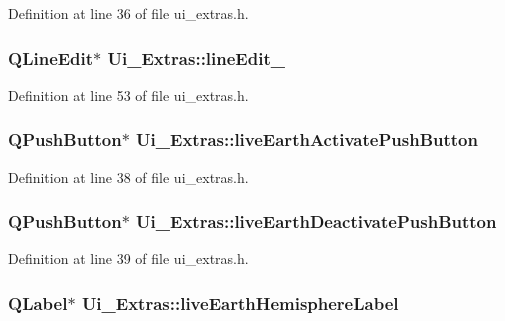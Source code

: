 Definition at line 36 of file ui\_\-extras.h.

\hypertarget{classUi__Extras_a6938f33168c2bb62d7b3ad3092391a3c}{
\subsubsection[{lineEdit\_\-2}]{\setlength{\rightskip}{0pt plus 5cm}QLineEdit$\ast$ {\bf Ui\_\-Extras::lineEdit\_}}}
\label{classUi__Extras_a6938f33168c2bb62d7b3ad3092391a3c}


Definition at line 53 of file ui\_\-extras.h.

\hypertarget{classUi__Extras_ac6fd999821ea077a5a9fb543acc16fd4}{
\subsubsection[{liveEarthActivatePushButton}]{\setlength{\rightskip}{0pt plus 5cm}QPushButton$\ast$ {\bf Ui\_\-Extras::liveEarthActivatePushButton}}}
\label{classUi__Extras_ac6fd999821ea077a5a9fb543acc16fd4}


Definition at line 38 of file ui\_\-extras.h.

\hypertarget{classUi__Extras_a0591653135ec37cba2db9a7cebc06393}{
\subsubsection[{liveEarthDeactivatePushButton}]{\setlength{\rightskip}{0pt plus 5cm}QPushButton$\ast$ {\bf Ui\_\-Extras::liveEarthDeactivatePushButton}}}
\label{classUi__Extras_a0591653135ec37cba2db9a7cebc06393}


Definition at line 39 of file ui\_\-extras.h.

\hypertarget{classUi__Extras_a32d0c47f2bdb36fa0dce8dc81bc51223}{
\subsubsection[{liveEarthHemisphereLabel}]{\setlength{\rightskip}{0pt plus 5cm}QLabel$\ast$ {\bf Ui\_\-Extras::liveEarthHemisphereLabel}}}
\label{classUi__Extras_a32d0c47f2bdb36fa0dce8dc81bc51223}


